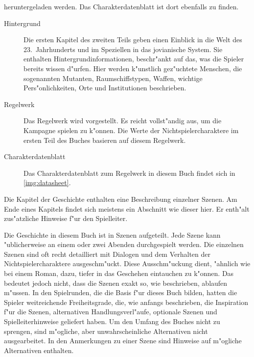 \begin{description}
        heruntergeladen werden. Das Charakterdatenblatt ist dort ebenfalls zu finden.
        \begin{description}
            \item [Hintergrund] Die ersten Kapitel des zweiten Teils  geben einen Einblick in die Welt des 
                23.~Jahrhunderts und im Speziellen in das jovianische System. Sie enthalten Hintergrundinformationen, beschr"ankt auf das, was die Spieler bereits wissen d"urfen. Hier werden k"unstlich gez"uchtete Menschen, die sogenannten Mutanten, Raumschiffstypen, Waffen, wichtige Pers"onlichkeiten, Orte und Institutionen beschrieben.
            \item [Regelwerk] Das Regelwerk wird  vorgestellt. Es reicht vollst"andig aus, um die Kampagne 
                spielen zu k"onnen. Die Werte der Nichtspielercharaktere im ersten Teil des Buches basieren auf diesem Regelwerk.
            \item [Charakterdatenblatt] Das Charakterdatenblatt zum Regelwerk in diesem Buch findet sich in \cref{img:datasheet}.
        \end{description}        
\end{description}


\begin{remarks}
    Die Kapitel der Geschichte enthalten eine Beschreibung einzelner Szenen. Am Ende eines Kapitels findet sich meistens ein Abschnitt wie dieser hier. Er enth"alt zus"atzliche Hinweise f"ur den Spielleiter.
\end{remarks}


Die Geschichte in diesem Buch ist in Szenen aufgeteilt. Jede Szene kann "ublicherweise an einem oder zwei Abenden durchgespielt werden. Die einzelnen Szenen sind oft recht detailliert mit Dialogen und dem Verhalten der Nichtspielercharaktere ausgeschm"uckt. Diese Ausschm"uckung dient, "ahnlich wie bei einem Roman, dazu, tiefer in das Geschehen eintauchen zu k"onnen. Das bedeutet jedoch nicht, dass die Szenen exakt so, wie beschrieben, ablaufen m"ussen. In den Spielrunden, die die Basis f"ur dieses Buch bilden, hatten die Spieler weitreichende Freiheitsgrade, die, wie anfangs beschrieben, die Inspiration f"ur die Szenen, alternativen Handlungsverl"aufe, optionale Szenen und Spielleiterhinweise geliefert haben. Um den Umfang des Buches nicht zu sprengen, sind m"ogliche, aber unwahrscheinliche Alternativen nicht ausgearbeitet. In den Anmerkungen zu einer Szene sind Hinweise auf m"ogliche Alternativen enthalten.

